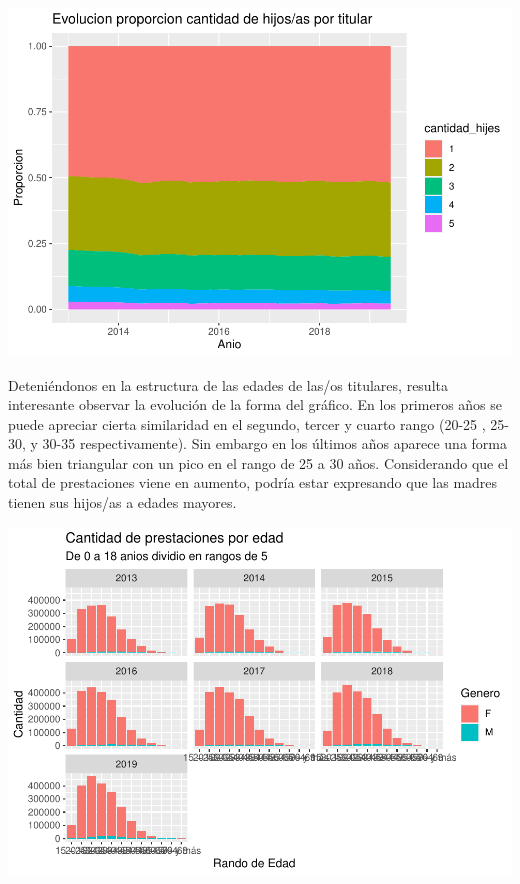 \documentclass[
  12,
]{article}
\begin{document}
\includegraphics{Grupo4_Final_files/figure-latex/grafico_prestaciones_por_familia-1.pdf}

Deteniéndonos en la estructura de las edades de las/os titulares,
resulta interesante observar la evolución de la forma del gráfico. En
los primeros años se puede apreciar cierta similaridad en el segundo,
tercer y cuarto rango (20-25 , 25-30, y 30-35 respectivamente). Sin
embargo en los últimos años aparece una forma más bien triangular con un
pico en el rango de 25 a 30 años. Considerando que el total de
prestaciones viene en aumento, podría estar expresando que las madres
tienen sus hijos/as a edades mayores.

\includegraphics{Grupo4_Final_files/figure-latex/grafico_prestaciones_edad-1.pdf}
\end{document}

